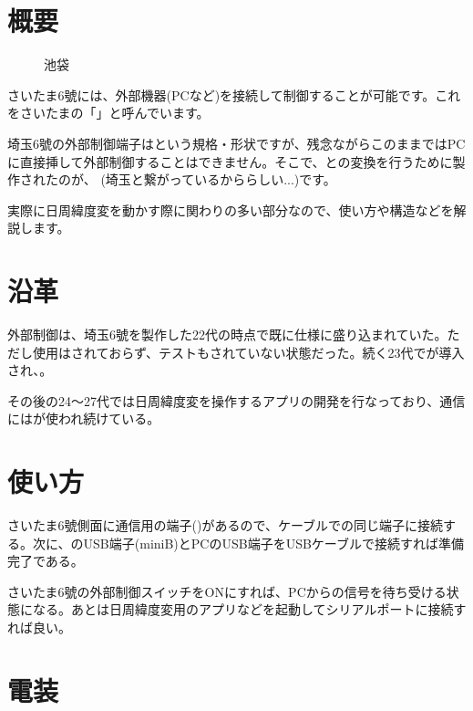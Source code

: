 \documentclass[letterpaper,10pt,dvipdfmx]{sphinxmanual}
\begin{document}
\section{概要}
\label{\detokenize{nissyu-idohen/ikebukuro:id1}}\begin{figure}[htbp]
\centering
\capstart

\noindent{}
\caption{池袋}\label{\detokenize{nissyu-idohen/ikebukuro:id12}}\end{figure}

さいたま6號には、外部機器(PCなど)を接続して制御することが可能です。これをさいたまの「」と呼んでいます。

埼玉6號の外部制御端子はという規格・形状ですが、残念ながらこのままではPCに直接挿して外部制御することはできません。そこで、との変換を行うために製作されたのが、
(埼玉と繋がっているかららしい...)です。

実際に日周緯度変を動かす際に関わりの多い部分なので、使い方や構造などを解説します。


\section{沿革}
\label{\detokenize{nissyu-idohen/ikebukuro:id2}}
外部制御は、埼玉6號を製作した22代の時点で既に仕様に盛り込まれていた。ただし使用はされておらず、テストもされていない状態だった。続く23代でが導入され、。

その後の24〜27代では日周緯度変を操作するアプリの開発を行なっており、通信にはが使われ続けている。


\section{使い方}
\label{\detokenize{nissyu-idohen/ikebukuro:id3}}
さいたま6號側面に通信用の端子()があるので、ケーブルでの同じ端子に接続する。次に、のUSB端子(miniB)とPCのUSB端子をUSBケーブルで接続すれば準備完了である。

さいたま6號の外部制御スイッチをONにすれば、PCからの信号を待ち受ける状態になる。あとは日周緯度変用のアプリなどを起動してシリアルポートに接続すれば良い。


\section{電装}
\label{\detokenize{nissyu-idohen/ikebukuro:id4}}
\end{document}
